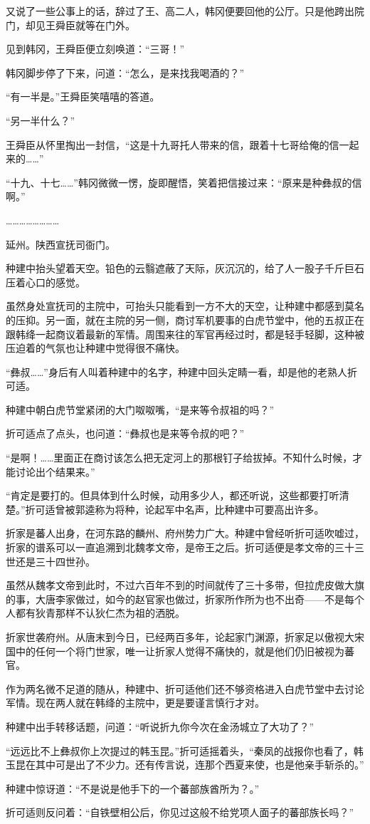 又说了一些公事上的话，辞过了王、高二人，韩冈便要回他的公厅。只是他跨出院门，却见王舜臣就等在门外。

见到韩冈，王舜臣便立刻唤道：“三哥！”

韩冈脚步停了下来，问道：“怎么，是来找我喝酒的？”

“有一半是。”王舜臣笑嘻嘻的答道。

“另一半什么？”

王舜臣从怀里掏出一封信，“这是十九哥托人带来的信，跟着十七哥给俺的信一起来的……”

“十九、十七……”韩冈微微一愣，旋即醒悟，笑着把信接过来：“原来是种彝叔的信啊。”

……………………

延州。陕西宣抚司衙门。

种建中抬头望着天空。铅色的云翳遮蔽了天际，灰沉沉的，给了人一股子千斤巨石压着心口的感觉。

虽然身处宣抚司的主院中，可抬头只能看到一方不大的天空，让种建中都感到莫名的压抑。另一面，就在主院的另一侧，商讨军机要事的白虎节堂中，他的五叔正在跟韩绛一起商议着最新的军情。周围来往的军官再经过时，都是轻手轻脚，这种被压迫着的气氛也让种建中觉得很不痛快。

“彝叔……”身后有人叫着种建中的名字，种建中回头定睛一看，却是他的老熟人折可适。

种建中朝白虎节堂紧闭的大门呶呶嘴，“是来等令叔祖的吗？”

折可适点了点头，也问道：“彝叔也是来等令叔的吧？”

“是啊！……里面正在商讨该怎么把无定河上的那根钉子给拔掉。不知什么时候，才能讨论出个结果来。”

“肯定是要打的。但具体到什么时候，动用多少人，都还听说，这些都要打听清楚。”折可适曾被郭逵称为将种，论起军中名声，比种建中可要高出许多。

折家是蕃人出身，在河东路的麟州、府州势力广大。种建中曾经听折可适吹嘘过，折家的谱系可以一直追溯到北魏孝文帝，是帝王之后。折可适便是孝文帝的三十三世还是三十四世孙。

虽然从魏孝文帝到此时，不过六百年不到的时间就传了三十多带，但拉虎皮做大旗的事，大唐李家做过，如今的赵官家也做过，折家所作所为也不出奇——不是每个人都有狄青那样不认狄仁杰为祖的洒脱。

折家世袭府州。从唐末到今日，已经两百多年，论起家门渊源，折家足以傲视大宋国中的任何一个将门世家，唯一让折家人觉得不痛快的，就是他们仍旧被视为蕃官。

作为两名微不足道的随从，种建中、折可适他们还不够资格进入白虎节堂中去讨论军情。现在两人就在韩绛的主院中，更是要谨言慎行才对。

种建中出手转移话题，问道：“听说折九你今次在金汤城立了大功了？”

“远远比不上彝叔你上次提过的韩玉昆。”折可适摇着头，“秦凤的战报你也看了，韩玉昆在其中可是出了不少力。还有传言说，连那个西夏来使，也是他亲手斩杀的。”

种建中惊讶道：“不是说是他手下的一个蕃部族酋所为？。”

折可适则反问着：“自铁壁相公后，你见过这般不给党项人面子的蕃部族长吗？”

